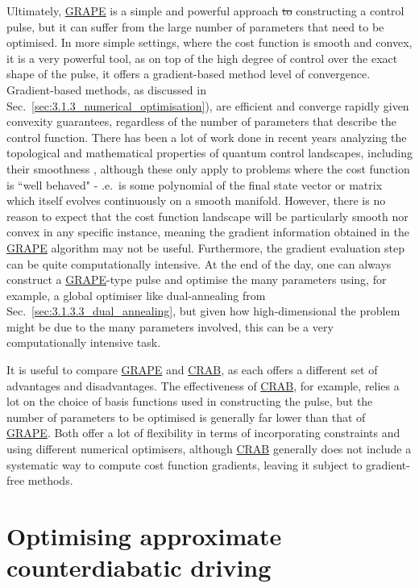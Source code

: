 \documentclass[a4paper,oneside,11pt]{book}
\newcommand{\acrref}[1]{\hyperref[acr:#1]{#1}}
\providecommand{\DIFaddtex}[1]{{\protect\color{blue}\uwave{#1}}} %
\providecommand{\DIFdeltex}[1]{{\protect\color{red}\sout{#1}}}                      %
\providecommand{\DIFaddbegin}{} %
\providecommand{\DIFaddend}{} %
\providecommand{\DIFdelbegin}{} %
\providecommand{\DIFdelend}{} %
\providecommand{\DIFadd}[1]{\texorpdfstring{\DIFaddtex{#1}}{#1}} %
\providecommand{\DIFdel}[1]{\texorpdfstring{\DIFdeltex{#1}}{}} %
\newcommand{\DIFscaledelfig}{0.5}
\newlength{\DIFdelgraphicswidth} %
\newlength{\DIFdelgraphicsheight} %
\newcommand{\DIFaddincludegraphics}[2][]{{\color{blue}\fbox{\DIFOincludegraphics[#1]{#2}}}} %
\newcommand{\DIFdelincludegraphics}[2][]{%
\sbox{\DIFdelgraphicsbox}{\DIFOincludegraphics[#1]{#2}}%
\settoboxwidth{\DIFdelgraphicswidth}{\DIFdelgraphicsbox} %
\settoboxtotalheight{\DIFdelgraphicsheight}{\DIFdelgraphicsbox} %
\scalebox{\DIFscaledelfig}{%
\parbox[b]{\DIFdelgraphicswidth}{\usebox{\DIFdelgraphicsbox}\\[-\baselineskip] \rule{\DIFdelgraphicswidth}{0em}}\llap{\resizebox{\DIFdelgraphicswidth}{\DIFdelgraphicsheight}{%
\setlength{\unitlength}{\DIFdelgraphicswidth}%
\begin{picture}(1,1)%
\thicklines\linethickness{2pt} %
{\color[rgb]{1,0,0}\put(0,0){\framebox(1,1){}}}%
{\color[rgb]{1,0,0}\put(0,0){\line( 1,1){1}}}%
{\color[rgb]{1,0,0}\put(0,1){\line(1,-1){1}}}%
\end{picture}%
}\hspace*{3pt}}} %
} %
\DeclareRobustCommand{\DIFaddbegin}{\DIFOaddbegin \let\includegraphics\DIFaddincludegraphics} %
\DeclareRobustCommand{\DIFaddend}{\DIFOaddend \let\includegraphics\DIFOincludegraphics} %
\DeclareRobustCommand{\DIFdelbegin}{\DIFOdelbegin \let\includegraphics\DIFdelincludegraphics} %
\DeclareRobustCommand{\DIFdelend}{\DIFOaddend \let\includegraphics\DIFOincludegraphics} %
\begin{document}
Ultimately, \acrref{GRAPE} is a simple and powerful approach \DIFdelbegin \DIFdel{to }\DIFdelend \DIFaddbegin \DIFadd{for }\DIFaddend constructing a control pulse, but it can suffer from the large number of parameters that need to be optimised. In more simple settings, where the cost function is smooth and convex, it is a very powerful tool, as on top of the high degree of control over the exact shape of the pulse, it offers a gradient-based method level of convergence. Gradient-based methods, as discussed in Sec.~\ref{sec:3.1.3_numerical_optimisation}), are efficient and converge rapidly given convexity guarantees, regardless of the number of parameters that describe the control function. There has been a lot of work done in recent years analyzing the topological and mathematical properties of quantum control landscapes, including their smoothness \cite{chakrabarti_quantum_2007, rabitz_surprising_2023,dong_quantum_2022}, although these only apply to problems where the cost function is ``well behaved" - \@i.e.~is some polynomial of the final state vector or matrix which itself evolves continuously on a smooth manifold.  However, there is no reason to expect that the cost function landscape will be particularly smooth nor convex in any specific instance, meaning the gradient information obtained in the \acrref{GRAPE} algorithm may not be useful. Furthermore, the gradient evaluation step can be quite computationally intensive. At the end of the day, one can always construct a \acrref{GRAPE}-type pulse and optimise the many parameters using, for example, a global optimiser like dual-annealing from Sec.~\ref{sec:3.1.3.3_dual_annealing}, but given how high-dimensional the problem might be due to the many parameters involved, this can be a very computationally intensive task.

It is useful to compare \acrref{GRAPE} and \acrref{CRAB}, as each offers a different set of advantages and disadvantages. The effectiveness of \acrref{CRAB}, for example, relies a lot on the choice of basis functions used in constructing the pulse, but the number of parameters to be optimised is generally far lower than that of \acrref{GRAPE}. Both offer a lot of flexibility in terms of incorporating constraints and using different numerical optimisers, although \acrref{CRAB} generally does not include a systematic way to compute cost function gradients, leaving it subject to gradient-free methods. 
\part{Optimising approximate counterdiabatic driving}\label{part:COLD}
\end{document}
